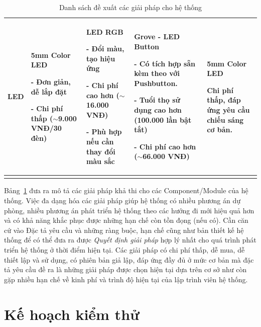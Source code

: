 {{\begin{longtable}{|p{2.3cm}|p{3.2cm}|p{3.2cm}|p{3.2cm}|p{3.5cm}|}
LED 

& \textbf{5mm Color LED}


- Đơn giản, dễ lắp đặt


- Chi phí thấp ($\sim$9.000 VNĐ/30 đèn) 

& \textbf{LED RGB}


- Đổi màu, tạo hiệu ứng


- Chi phí cao hơn ($\sim$16.000 VNĐ)


- Phù hợp nếu cần thay đổi màu sắc 

& \textbf{Grove - LED Button}


- Có tích hợp sẵn kèm theo với Pushbutton.


- Tuổi thọ sử dụng cao hơn (100.000 lần bật tắt)


- Chi phí cao hơn ($\sim$66.000 VNĐ) 

& \textbf{5mm Color LED}


Chi phí thấp, đáp ứng yêu cầu chiếu sáng cơ bản. \\ \hline

\caption{Danh sách đề xuất các giải pháp cho hệ thống}
\label{tab:sugg}
\end{longtable}

}

Bảng~\ref{tab:sugg} đưa ra mô tả các giải pháp khả thi cho các Component/Module của hệ thống. Việc đa dạng hóa các giải pháp giúp hệ thống có nhiều phương án dự phòng, nhiều phương án phát triển hệ thống theo các hướng đi mới hiệu quả hơn và có khả năng khắc phục được những hạn chế còn tồn đọng (nếu có). Cần căn cứ vào Đặc tả yêu cầu và những ràng buộc, hạn chế cũng như bản thiết kế hệ thống để có thể đưa ra được \textit{Quyết định giải pháp} hợp lý nhất cho quá trình phát triển hệ thống ở thời điểm hiện tại. Các giải pháp có chi phí thấp, dễ mua, dễ thiết lập và sử dụng, có phiên bản giả lập, đáp ứng đầy đủ ở mức cơ bản mà đặc tả yêu cầu đề ra là những giải pháp được chọn hiện tại dựa trên cơ sở như còn gặp nhiều hạn chế về kinh phí và trình độ hiện tại của lập trình viên hệ thống. 


\pagebreak
\section{Kế hoạch kiểm thử}
}
